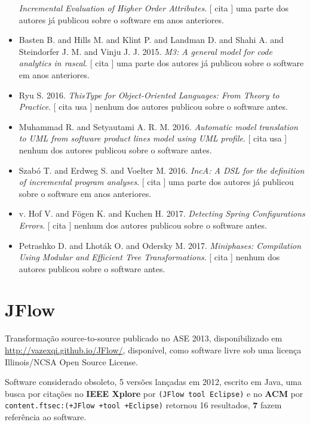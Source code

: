 \begin{itemize}
        \textit{ Incremental Evaluation of Higher Order Attributes}.
      [
          cita
      ]
uma parte dos autores já publicou sobre o software em anos anteriores.
\item Basten B. and Hills M. and Klint P. and Landman D. and Shahi A. and Steindorfer J. M. and Vinju J. J.
      2015.
        \textit{ M3: A general model for code analytics in rascal}.
      [
          cita
      ]
uma parte dos autores já publicou sobre o software em anos anteriores.
\item Ryu S.
      2016.
        \textit{ ThisType for Object-Oriented Languages: From Theory to Practice}.
      [
          cita
          usa
      ]
nenhum dos autores publicou sobre o software antes.
\item Muhammad R. and Setyautami A. R. M.
      2016.
        \textit{ Automatic model translation to UML from software product lines model using UML profile}.
      [
          cita
          usa
      ]
nenhum dos autores publicou sobre o software antes.
\item Szabó T. and Erdweg S. and Voelter M.
      2016.
        \textit{ IncA: A DSL for the definition of incremental program analyses}.
      [
          cita
      ]
uma parte dos autores já publicou sobre o software em anos anteriores.
\item v. Hof V. and F\"{o}gen K. and Kuchen H.
      2017.
        \textit{ Detecting Spring Configurations Errors}.
      [
          cita
      ]
nenhum dos autores publicou sobre o software antes.
\item Petrashko D. and Lhot\'{a}k O. and Odersky M.
      2017.
        \textit{ Miniphases: Compilation Using Modular and Efficient Tree Transformations}.
      [
          cita
      ]
nenhum dos autores publicou sobre o software antes.
\end{itemize}
\section{JFlow}

Transformação source-to-source
publicado no ASE 2013,
disponibilizado em \url{http://vazexqi.github.io/JFlow/},
disponível,
como software livre
sob uma licença Illinois/NCSA Open Source License.

Software considerado obsoleto,
5 versões lançadas
em 2012,
escrito em Java,
uma busca por citações no {\bf IEEE Xplore} por
\texttt{(JFlow tool Eclipse)}
e no {\bf ACM} por
\texttt{content.ftsec:(+JFlow +tool +Eclipse)}
retornou
16 resultados,
{\bf 7} fazem referência ao software.


